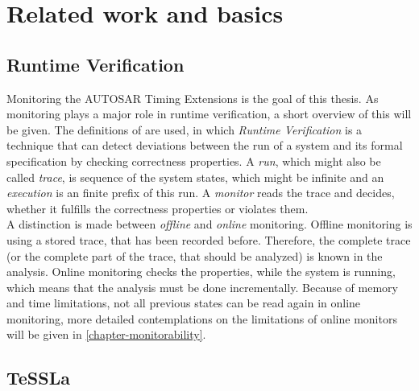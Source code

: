 
\chapter{Related work and basics}
\label{chapter-Related-Work}

\section{Runtime Verification}
	Monitoring the AUTOSAR Timing Extensions is the goal of this thesis. As monitoring plays a major role in runtime verification, a short overview of this will be given. The definitions of \cite{RuntimeVerification} are used, in which \emph{Runtime Verification} is a technique that can detect deviations between the run of a system and its formal specification by checking correctness properties. A \emph{run}, which might also be called \emph{trace}, is sequence of the system states, which might be infinite and an \emph{execution} is an finite prefix of this run. A \emph{monitor} reads the trace and decides, whether it fulfills the correctness properties or violates them.\\
	A distinction is made between \emph{offline} and \emph{online} monitoring. Offline monitoring is using a stored trace, that has been recorded before. Therefore, the complete trace (or the complete part of the trace, that should be analyzed) is known in the analysis. Online monitoring checks the properties, while the system is running, which means that the analysis must be done incrementally. Because of memory and time limitations, not all previous states can be read again in online monitoring, more detailed contemplations on the limitations of online monitors will be given in \ref{chapter-monitorability}.


\section{TeSSLa}

